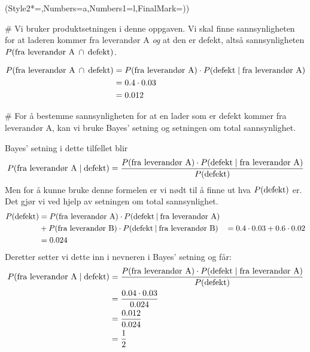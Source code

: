 \begin{easylist}[enumerate]
	\ListProperties(Style2*=,Numbers=a,Numbers1=l,FinalMark={)})
	
	
	# Vi bruker produktsetningen i denne oppgaven. 
	Vi skal finne sannsynligheten for at laderen kommer fra leverandør A \emph{og} at den er defekt, altså sannsynligheten $P(\textnormal{fra leverandør A} \: \cap \: \textnormal{defekt})$.
	
	\begin{align*}
			P(\textnormal{fra leverandør A} \: \cap \: \textnormal{defekt}) & = P(\textnormal{fra leverandør A}) \cdot P(\textnormal{defekt}  \mid \textnormal{fra leverandør A}) \\
			& = 0.4 \cdot 0.03 \\
			& = 0.012
	\end{align*}
	
	
	# For å bestemme sannsynligheten for at en lader som er defekt kommer fra leverandør A, kan vi bruke Bayes' setning og setningen om total sannsynlighet. 
	
	Bayes' setning i dette tilfellet blir 
	\begin{align*}
			P(\textnormal{fra leverandør A} \mid  \textnormal{defekt}) &= \frac{P(\textnormal{fra leverandør A}) \cdot P(\textnormal{defekt} \mid \textnormal{fra leverandør A})}{P(\textnormal{defekt})} \\
	\end{align*}
	Men for å kunne bruke denne formelen er vi nødt til å finne ut hva $P(\textnormal{defekt})$ er. 
	Det gjør vi ved hjelp av setningen om total sannsynlighet.
	\begin{align*}
			P(\textnormal{defekt}) & = P(\textnormal{fra leverandør A}) \cdot P(\textnormal{defekt} \: | \: \textnormal{fra leverandør A}) \\
			& + P(\textnormal{fra leverandør B}) \cdot P(\textnormal{defekt} \: | \: \textnormal{fra leverandør B})
			& = 0.4 \cdot 0.03 + 0.6 \cdot 0.02 \\
			& = 0.024
	\end{align*}
	Deretter setter vi dette inn i nevneren i Bayes' setning og får:
	\begin{align*}
			P(\textnormal{fra leverandør A} \mid  \textnormal{defekt}) &= \frac{P(\textnormal{fra leverandør A}) \cdot P(\textnormal{defekt} \mid \textnormal{fra leverandør A})}{P(\textnormal{defekt})} \\
			& = \frac{0.04 \cdot 0.03}{0.024} \\
			& = \frac{0.012}{0.024} \\
			& = \frac{1}{2}
	\end{align*}	
	
\end{easylist}


